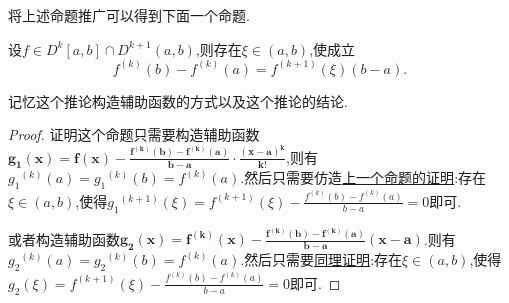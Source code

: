 \documentclass[lang=cn,newtx,10pt,scheme=chinese]{../Template/elegantbook}
\begin{document}
\begin{remark}
    将上述命题推广可以得到下面一个命题.
\end{remark}
\begin{corollary}\label{cor:Lagrange中值定理的推广(k+1阶导数)}
    设\(f\in D^{k}[a,b]\cap D^{k+1}\left( a,b \right) \),则存在\(\xi\in(a,b)\),使成立
    \[
    f^{(k)}(b) - f^{(k)}(a) = f^{(k+1)}(\xi)(b - a).
    \]
\end{corollary}
\begin{note}
    记忆这个推论构造辅助函数的方式以及这个推论的结论.
\end{note}
\begin{proof}
    证明这个命题只需要构造辅助函数$\boldsymbol{g}_{\boldsymbol{1}}\left( \boldsymbol{x} \right) =\boldsymbol{f}\left( \boldsymbol{x} \right) -\frac{\boldsymbol{f}^{\left( \boldsymbol{k} \right)}\left( \boldsymbol{b} \right) -\boldsymbol{f}^{\left( \boldsymbol{k} \right)}\left( \boldsymbol{a} \right)}{\boldsymbol{b}-\boldsymbol{a}}\cdot \frac{\left( \boldsymbol{x}-\boldsymbol{a} \right) ^{\boldsymbol{k}}}{\boldsymbol{k}!}$,则有${g_1}^{\left( k \right)}\left( a \right) ={g_1}^{\left( k \right)}\left( b \right) =f^{\left( k \right)}\left( a \right) .$然后只需要仿造\hyperref[proof:Lagrange中值定理的推广(二阶导数)-证明]{上一个命题的证明}:存在$\xi \in (a,b)$,使得${g_1}^{\left( k+1 \right)}\left( \xi \right) =f^{\left( k+1 \right)}\left( \xi \right) -\frac{f^{\left( k \right)}\left( b \right) -f^{\left( k \right)}\left( a \right)}{b-a}=0$即可.

或者构造辅助函数$\boldsymbol{g}_{\boldsymbol{2}}\left( \boldsymbol{x} \right) =\boldsymbol{f}^{\left( \boldsymbol{k} \right)}\left( \boldsymbol{x} \right) -\frac{\boldsymbol{f}^{\left( \boldsymbol{k} \right)}\left( \boldsymbol{b} \right) -\boldsymbol{f}^{\left( \boldsymbol{k} \right)}\left( \boldsymbol{a} \right)}{\boldsymbol{b}-\boldsymbol{a}}\left( \boldsymbol{x}-\boldsymbol{a} \right)$.则有${g_2}^{\left( k \right)}\left( a \right) ={g_2}^{\left( k \right)}\left( b \right) =f^{\left( k \right)}\left( a \right) .$然后只需要\hyperref[proof:Lagrange中值定理的推广(二阶导数)-证明]{同理证明}:存在$\xi \in (a,b)$,使得$g_2\left( \xi \right) =f^{\left( k+1 \right)}\left( \xi \right) -\frac{f^{\left( k \right)}\left( b \right) -f^{\left( k \right)}\left( a \right)}{b-a}=0$即可.

\end{proof}
\end{document}
